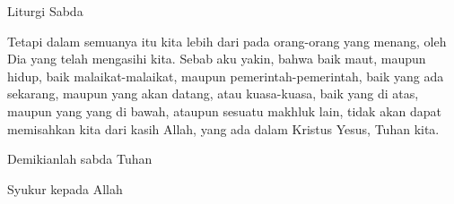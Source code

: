 \documentclass[12pt,a4paper]{beamer}
\begin{document}
\begin{frame}{Liturgi Sabda}
\begin{description}[1cm]
\item Tetapi dalam semuanya itu kita lebih dari pada orang-orang yang menang, oleh Dia yang telah mengasihi kita. Sebab aku yakin, bahwa baik maut, maupun hidup, baik malaikat-malaikat, maupun pemerintah-pemerintah, baik yang ada sekarang, maupun yang akan datang, atau kuasa-kuasa, baik yang di atas, maupun yang yang di bawah, ataupun sesuatu makhluk lain, tidak akan dapat memisahkan kita dari kasih Allah, yang ada dalam Kristus Yesus, Tuhan kita.

       Demikianlah sabda Tuhan

\item [U] Syukur kepada Allah 
\end{description}
\end{frame}
\end{document}
